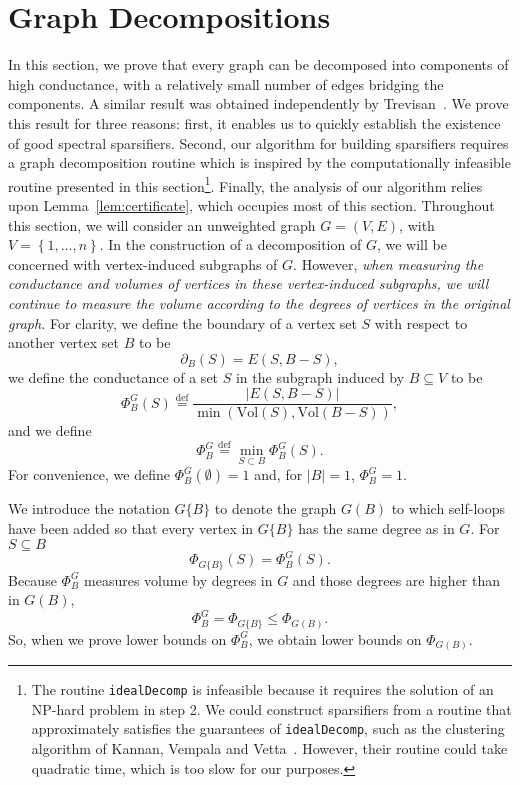 \documentclass[11pt]{article}
\def\bdry#1#2{\partial_{#1}\left(#2\right)}
\def\defeq{\stackrel{\mathrm{def}}{=}}
\def\setof#1{\left\{#1  \right\}}
\def\sizeof#1{\left|#1  \right|}
\def\setof#1{\left\{#1  \right\}}
\def\vol#1{\mathrm{Vol}\left(#1  \right)}
\def\conduc#1#2{\Phi_{#1}\left(#2  \right)}
\def\conducin#1#2{\Phi^{G}_{#1}\left(#2  \right)}
\def\Conduc#1{\Phi_{#1}}
\def\Conducin#1{\Phi^{G}_{#1}}
\begin{document}
\section{Graph Decompositions}\label{sec:decomp}
In this section, we prove
  that every graph can be decomposed into components of high conductance,
  with a relatively small number of edges bridging the components.
A similar result was obtained independently by Trevisan~\cite{Trevisan}.
We prove this result for three reasons: first, it enables us to quickly establish
  the existence of good spectral sparsifiers.
Second, our algorithm for building sparsifiers requires a graph
  decomposition routine which is inspired by the computationally
  infeasible routine presented in this section\footnote{The routine \texttt{idealDecomp} is infeasible because it requires
  the solution of an NP-hard problem in step 2.
We could construct sparsifiers from a routine that approximately satisfies
  the guarantees of \texttt{idealDecomp}, such as the clustering algorithm of
  Kannan, Vempala and Vetta~\cite{KannanVempalaVetta}.
However, their routine could take  quadratic time, which is too slow
  for our purposes.
}.
Finally, the analysis of our algorithm relies upon Lemma~\ref{lem:certificate}, which
  occupies most of this section.
Throughout this section, we will consider an unweighted graph $G = (V,E)$,
  with $V = \setof{1,\dotsc ,n}$.
In the construction  of a decomposition of $G$, we will be concerned with
  vertex-induced subgraphs of $G$.
However, \textit{when measuring the conductance and volumes of vertices in
  these vertex-induced subgraphs, we will continue to measure the
  volume according to the degrees of vertices in the original graph.}
For clarity, 
  we define the boundary of a vertex set $S$ with respect to another
  vertex set $B$ to be
\[
  \bdry{B}{S} = E (S, B- S),
\]
we define the conductance of a set $S$ in the subgraph induced
  by $B \subseteq V$ to be
\[
  \conducin{B}{S} \defeq
  \frac{\sizeof{E (S, B - S)}}
       {\min \left(\vol{S}, \vol{B - S} \right)},
\]
and we define
\[
  \Conducin{B}
   \defeq \min_{S \subset B} \conducin{B}{S}.
\]
For convenience, we define $\conducin{B}{\emptyset} = 1$ and, for $\sizeof{B} = 1$,
  $\Conducin{B}{} = 1$.

We introduce the notation $G\{B \}$ to denote the graph $G (B)$ to which self-loops
  have been added so that every vertex in $G\{B \}$ has the same degree as in $G$.
For $S \subseteq B$
\[
  \conduc{G\{B \}}{S} =
 \conducin{B}{S}.
\]
Because $\Conducin{B}$ measures volume by degrees in $G$
  and those degrees are higher than in $G (B)$,
\[
  \Conducin{B}{} =  \Conduc{G\{B \}} \leq   \Conduc{G (B)}{}.
\]
So, when we prove lower bounds on $ \Conducin{B}{}$, we obtain lower
  bounds on $ \Conduc{G (B)}{}$.
\end{document}
